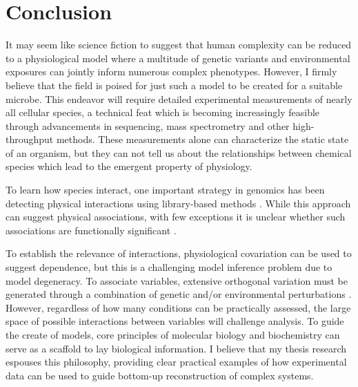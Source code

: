 \section{Conclusion}

It may seem like science fiction to suggest that human complexity can be reduced to a physiological model where a multitude of genetic variants and environmental exposures can jointly inform numerous complex phenotypes. However, I firmly believe that the field is poised for just such a model to be created for a suitable microbe. This endeavor will require detailed experimental measurements of nearly all cellular species, a technical feat which is becoming increasingly feasible through advancements in sequencing, mass spectrometry and other high-throughput methods. These measurements alone can characterize the static state of an organism, but they can not tell us about the relationships between chemical species which lead to the emergent property of physiology. 

To learn how species interact, one important strategy in genomics has been detecting physical interactions using library-based methods \cite{LiebermanAiden:2009jz, Fields:1989dm, Orsak:2012ci, Johnson:2007fh}.  While this approach can suggest physical associations, with few exceptions \cite{Reynolds:2011gs} it is unclear whether such associations are functionally significant \cite{Nandy:2010ej, Scheer:2011df}. 

To establish the relevance of interactions, physiological covariation can be used to suggest dependence, but this is a challenging model inference problem due to model degeneracy. To associate variables, extensive orthogonal variation must be generated through a combination of genetic and/or environmental perturbations \cite{Greenberg:2011jf}. However, regardless of how many conditions can be practically assessed, the large space of possible interactions between variables will challenge analysis. To guide the create of models, core principles of molecular biology and biochemistry can serve as a scaffold to lay biological information. I believe that my thesis research espouses this philosophy, providing clear practical examples of how experimental data can be used to guide bottom-up reconstruction of complex systems.

